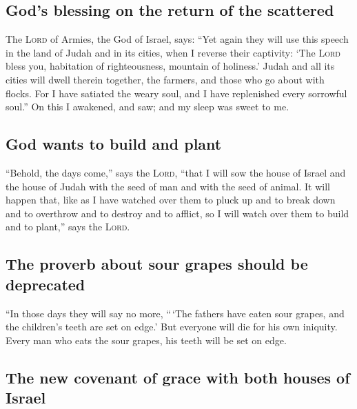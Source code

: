 \hypertarget{gods-blessing-on-the-return-of-the-scattered}{%
\subsection{God's blessing on the return of the
scattered}\label{gods-blessing-on-the-return-of-the-scattered}}

 The \textsc{Lord} of Armies, the God of Israel, says:
``Yet again they will use this speech in the land of Judah and in its
cities, when I reverse their captivity: `The \textsc{Lord} bless you,
habitation of righteousness, mountain of holiness.' 
Judah and all its cities will dwell therein together, the farmers, and
those who go about with flocks.  For I have satiated the
weary soul, and I have replenished every sorrowful soul.''
 On this I awakened, and saw; and my sleep was sweet to
me.

\hypertarget{god-wants-to-build-and-plant}{%
\subsection{God wants to build and
plant}\label{god-wants-to-build-and-plant}}

 ``Behold, the days come,'' says the \textsc{Lord},
``that I will sow the house of Israel and the house of Judah with the
seed of man and with the seed of animal.  It will happen
that, like as I have watched over them to pluck up and to break down and
to overthrow and to destroy and to afflict, so I will watch over them to
build and to plant,'' says the \textsc{Lord}.

\hypertarget{the-proverb-about-sour-grapes-should-be-deprecated}{%
\subsection{The proverb about sour grapes should be
deprecated}\label{the-proverb-about-sour-grapes-should-be-deprecated}}

 ``In those days they will say no more, ``\,`The fathers
have eaten sour grapes, and the children's teeth are set on edge.'
 But everyone will die for his own iniquity. Every man
who eats the sour grapes, his teeth will be set on edge.

\hypertarget{the-new-covenant-of-grace-with-both-houses-of-israel}{%
\subsection{The new covenant of grace with both houses of
Israel}\label{the-new-covenant-of-grace-with-both-houses-of-israel}}

